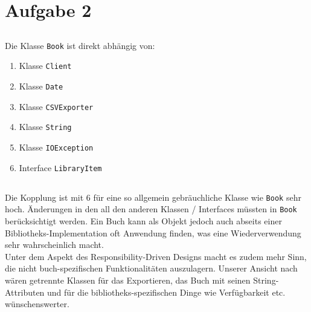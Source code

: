 \chapter{Aufgabe 2}
\section{}
Die Klasse \texttt{Book} ist direkt abhängig von:
\begin{enumerate}
	\item Klasse \texttt{Client}
	\item Klasse \texttt{Date}
	\item Klasse \texttt{CSVExporter}
	\item Klasse \texttt{String}
	\item Klasse \texttt{IOException}
	\item Interface \texttt{LibraryItem}

\end{enumerate}

\section{}
Die Kopplung ist mit 6 für eine so allgemein gebräuchliche Klasse wie \texttt{Book} sehr hoch.
Änderungen in den all den anderen Klassen / Interfaces müssten in \texttt{Book} berücksichtigt werden. 
Ein Buch kann als Objekt jedoch auch abseits einer Bibliotheks-Implementation oft Anwendung finden, was eine Wiederverwendung sehr wahrscheinlich macht.
\\ 
Unter dem Aspekt des Responsibility-Driven Designs macht es zudem mehr Sinn, die nicht buch-spezifischen Funktionalitäten auszulagern.
Unserer Ansicht nach wären getrennte Klassen für das Exportieren, das Buch mit seinen String-Attributen und für die bibliotheks-spezifischen Dinge wie Verfügbarkeit etc. wünschenswerter.  